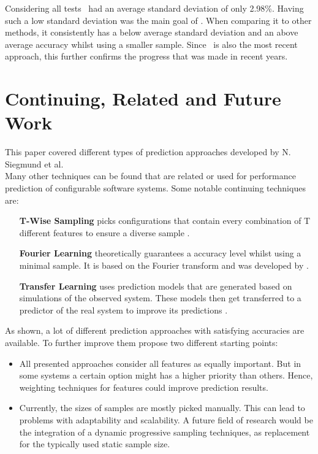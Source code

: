 Considering all tests \WHAT~had an average standard deviation of only 2.98\%. Having such a low standard deviation was the main goal of \WHAT. When comparing it to other methods, it consistently has a below average standard deviation and an above average accuracy whilst using a smaller sample. Since \WHAT~is also the most recent approach, this further confirms the progress that was made in recent years.

\FloatBarrier
\section{Continuing, Related and Future Work}

This paper covered different types of prediction approaches developed by N. Siegmund et al.\\Many other techniques can be found that are related or used for performance prediction of configurable software systems. Some notable continuing techniques are:
\begin{itemize}[leftmargin=*,align=left]
	\item[\textbf{T-Wise Sampling}] picks configurations that contain every combination of T different features to ensure a diverse sample \cite{T-WiseSampling}.	
	\item[\textbf{Fourier Learning}] theoretically guarantees a accuracy level whilst using a minimal sample. It is based on the Fourier transform and was developed by \citet{FourierLearning}.
	\item[\textbf{Transfer Learning}] uses prediction models that are generated based on simulations of the observed system. These models then get transferred to a predictor of the real system to improve its predictions \cite{TransferLearningforImprovingModelPredictionsJamshidiVKSK17}.	
\end{itemize}

\noindent
As shown, a lot of different prediction approaches with satisfying accuracies are available. To further improve them \citet{FasterDiscoveryofFasterSystemConfigurationsSiegmund2017} propose two different starting points:
 \begin{itemize}
 	 \item  All presented approaches consider all features as equally important. But in some systems a certain option might has a higher priority than others. Hence, weighting techniques for features could improve prediction results.
 	 \item Currently, the sizes of samples are mostly picked manually. This can lead to problems with adaptability and scalability. A future field of research would be the integration of a dynamic progressive sampling techniques, as replacement for the typically used static sample size.
 \end{itemize}

